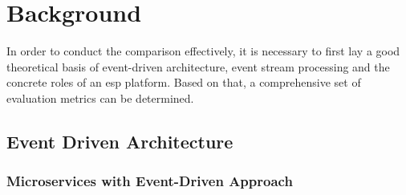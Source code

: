 \chapter{Background} \label{chap:background}
In order to conduct the comparison effectively, it is necessary to first lay a good theoretical basis of event-driven architecture, event stream processing and the concrete roles of an \acrshort{esp} platform. Based on that, a comprehensive set of evaluation metrics can be determined.


\section{Event Driven Architecture}


\subsection{Microservices with Event-Driven Approach} \label{section:eventdriven}

